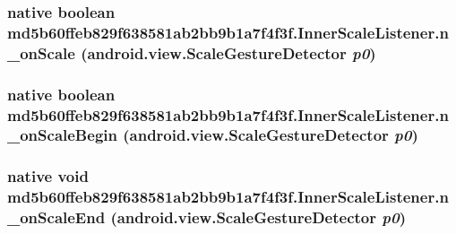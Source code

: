 \hypertarget{classmd5b60ffeb829f638581ab2bb9b1a7f4f3f_1_1_inner_scale_listener_91faa282db003e8926259969696d9b9e}{
\subsubsection[{n\_\-onScale}]{\setlength{\rightskip}{0pt plus 5cm}native boolean md5b60ffeb829f638581ab2bb9b1a7f4f3f.InnerScaleListener.n\_\-onScale (android.view.ScaleGestureDetector {\em p0})}}
\label{classmd5b60ffeb829f638581ab2bb9b1a7f4f3f_1_1_inner_scale_listener_91faa282db003e8926259969696d9b9e}


\hypertarget{classmd5b60ffeb829f638581ab2bb9b1a7f4f3f_1_1_inner_scale_listener_b86d54aeb6cce4d552b0d578483a070f}{
\subsubsection[{n\_\-onScaleBegin}]{\setlength{\rightskip}{0pt plus 5cm}native boolean md5b60ffeb829f638581ab2bb9b1a7f4f3f.InnerScaleListener.n\_\-onScaleBegin (android.view.ScaleGestureDetector {\em p0})}}
\label{classmd5b60ffeb829f638581ab2bb9b1a7f4f3f_1_1_inner_scale_listener_b86d54aeb6cce4d552b0d578483a070f}


\hypertarget{classmd5b60ffeb829f638581ab2bb9b1a7f4f3f_1_1_inner_scale_listener_43f4b9e4648733eb24555ee18fffa626}{
\subsubsection[{n\_\-onScaleEnd}]{\setlength{\rightskip}{0pt plus 5cm}native void md5b60ffeb829f638581ab2bb9b1a7f4f3f.InnerScaleListener.n\_\-onScaleEnd (android.view.ScaleGestureDetector {\em p0})}}
\label{classmd5b60ffeb829f638581ab2bb9b1a7f4f3f_1_1_inner_scale_listener_43f4b9e4648733eb24555ee18fffa626}


